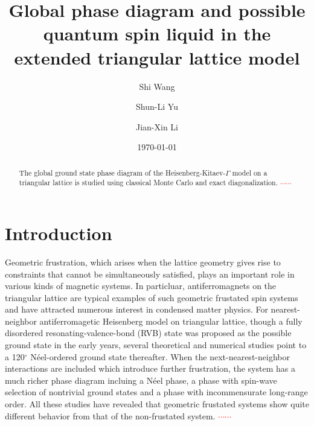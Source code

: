 \documentclass[aps,prb,reprint,groupedaddress,showpacs,amsfonts,amsmath,amssymb,superscriptaddress]{revtex4-1}
\begin{document}
\title{Global phase diagram and possible quantum spin liquid in the extended triangular lattice model}

\author{Shi Wang}
\author{Shun-Li Yu}
\author{Jian-Xin Li}

\date{\today}

\begin{abstract}
    The global ground state phase diagram of the Heisenberg-Kitaev-$\Gamma$ model on a triangular lattice is studied using classical Monte Carlo and exact diagonalization. \textcolor{red}{$\cdots \cdots$}
\end{abstract}

\maketitle

\section{Introduction}
Geometric frustration, which arises when the lattice geometry gives rise to constraints that cannot be simultaneously satisfied, plays an important role in various kinds of magnetic systems. In particluar, antiferromagnets on the triangular lattice are typical examples of such geometric frustated spin systems and have attracted numerous interest in condensed matter physics. For nearest-neighbor antiferromagetic Heisenberg model on triangular lattice, though a fully disordered resonating-valence-bond (RVB) state was proposed as the possible ground state in the early years, several theoretical and numerical studies point to a 120$^\circ$ N\'{e}el-ordered ground state thereafter. When the next-nearest-neighbor interactions are included which introduce further frustration, the system has a much richer phase diagram incluing a N\'{e}el phase, a phase with spin-wave selection of nontrivial ground states and a phase with incommensurate long-range order. All these studies have revealed that geometric frustated systems show quite different behavior from that of the non-frustated system. \textcolor{red}{$\cdots\cdots$}
\end{document}
